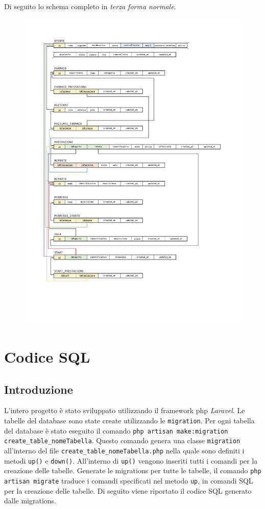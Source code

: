 \documentclass[paper=a4, fontsize=11pt,x11names]{report}
\begin{document}
Di seguito lo schema completo in \textit{terza forma normale}.
\begin{figure}
\begin{center}
\includegraphics[scale=0.85]{schema_relazionale}
\end{center}
\end{figure}



\chapter{Codice SQL}
\section{Introduzione}
L'intero progetto è stato sviluppato utilizzando il framework php \textit{Laravel}. Le tabelle del database sono state create utilizzando le \texttt{migration}. Per ogni tabella del database è stato eseguito il comando \texttt{php artisan make:migration create\_table\_nomeTabella}. Questo comando genera una classe \texttt{migration} all'interno del file \texttt{create\_table\_nomeTabella.php} nella quale sono definiti i metodi \texttt{up()} e \texttt{down()}. All'interno di \texttt{up()} vengono inseriti tutti i comandi per la creazione delle tabelle. Generate le migrations per tutte le tabelle, il comando \texttt{php artisan migrate} traduce i comandi specificati nel metodo \texttt{up}, in comandi SQL per la creazione delle tabelle. Di seguito viene riportato il codice SQL generato dalle migrations.
\end{document}
